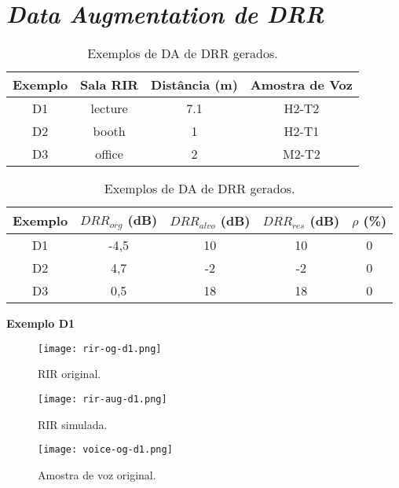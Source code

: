 \section{\textit{Data Augmentation de DRR}}

\begin{table} [H]
    \centering
    \caption{Exemplos de DA de DRR gerados.}
    \label{tbl-a:da-drr}
    \begin{tabular}{c|c|c|c}

        \textbf{Exemplo} & 
        \textbf{Sala RIR} & 
        \textbf{Distância (m)} &
        \textbf{Amostra de Voz} \\
        \hline 

        D1 & lecture & 7.1 & H2-T2 \\
        D2 & booth & 1 & H2-T1 \\
        D3 & office & 2 & M2-T2 \\

    \end{tabular}
    \bigbreak
    \bigbreak
    \begin{tabular}{c|c|c|c|c}

        \textbf{Exemplo} & 
        \textbf{$DRR_{org}$ (dB)} & 
        \textbf{$DRR_{alvo}$ (dB)} &
        \textbf{$DRR_{res}$ (dB)} & 
        \textbf{$\rho$ (\%)} \\
        \hline 

        D1 & -4,5 & 10 & 10 & 0 \\
        D2 & 4,7 & -2 & -2 & 0 \\
        D3 & 0,5 & 18 & 18 & 0 \\

    \end{tabular}
\end{table}

\pagebreak
{\Large \textbf{Exemplo D1}}

\begin{figure} [H]
    \centering
    \texttt{[image: rir-og-d1.png]}
    \caption{RIR original.}
    \label{fig-a:rir-og-d1}
\end{figure} 

\begin{figure} [H]
    \centering
    \texttt{[image: rir-aug-d1.png]}
    \caption{RIR simulada.}
    \label{fig-a:rir-aug-d1}
\end{figure} 

\begin{figure} [H]
    \centering
    \texttt{[image: voice-og-d1.png]}
    \caption{Amostra de voz original.}
    \label{fig-a:voice-og-d1}
\end{figure} 

